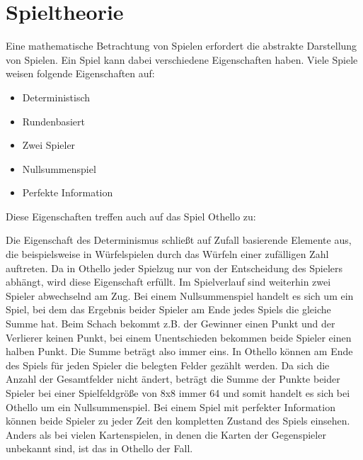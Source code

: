 \section{Spieltheorie}

Eine mathematische Betrachtung von Spielen erfordert die abstrakte Darstellung von Spielen.
Ein Spiel kann dabei verschiedene Eigenschaften haben. Viele Spiele weisen folgende Eigenschaften auf:

\begin{itemize}
    \item Deterministisch
    \item Rundenbasiert
    \item Zwei Spieler
    \item Nullsummenspiel
    \item Perfekte Information
\end{itemize}

Diese Eigenschaften treffen auch auf das Spiel Othello zu:

Die Eigenschaft des Determinismus schließt auf Zufall basierende Elemente aus, die beispielsweise in Würfelspielen durch das Würfeln einer zufälligen Zahl auftreten.
Da in Othello jeder Spielzug nur von der Entscheidung des Spielers abhängt, wird diese Eigenschaft erfüllt.
Im Spielverlauf sind weiterhin zwei Spieler abwechselnd am Zug.
Bei einem Nullsummenspiel handelt es sich um ein Spiel, bei dem das Ergebnis beider Spieler am Ende jedes Spiels die gleiche Summe hat.
Beim Schach bekommt z.B. der Gewinner einen Punkt und der Verlierer keinen Punkt, bei einem Unentschieden bekommen beide Spieler einen halben Punkt.
Die Summe beträgt also immer eins.
In Othello können am Ende des Spiels für jeden Spieler die belegten Felder gezählt werden.
Da sich die Anzahl der Gesamtfelder nicht ändert, beträgt die Summe der Punkte beider Spieler bei einer Spielfeldgröße von 8x8 immer 64 und somit handelt es sich bei Othello um ein Nullsummenspiel.
Bei einem Spiel mit perfekter Information können beide Spieler zu jeder Zeit den kompletten Zustand des Spiels einsehen.
Anders als bei vielen Kartenspielen, in denen die Karten der Gegenspieler unbekannt sind, ist das in Othello der Fall.
\cite[S.~161f.]{ai2010russel}

